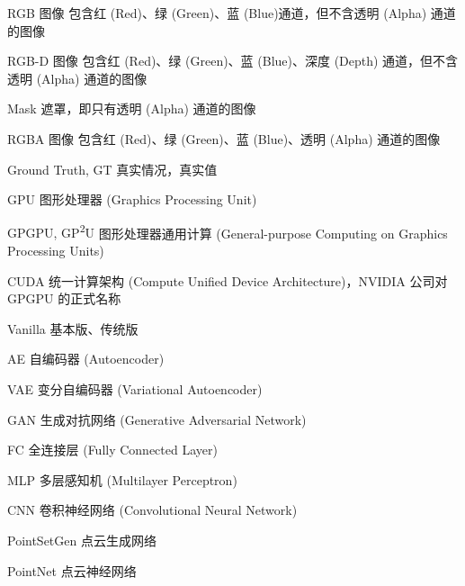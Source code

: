 \begin{denotation}[2.8cm]

	\item[RGB 图像]  包含红 (Red)、绿 (Green)、蓝 (Blue)通道，但不含透明 (Alpha) 通道的图像
	\item[RGB-D 图像]  包含红 (Red)、绿 (Green)、蓝 (Blue)、深度 (Depth) 通道，但不含透明 (Alpha) 通道的图像
	\item[Mask]     遮罩，即只有透明 (Alpha) 通道的图像
	\item[RGBA 图像] 包含红 (Red)、绿 (Green)、蓝 (Blue)、透明 (Alpha) 通道的图像

	\item[Ground Truth, GT] 真实情况，真实值

	\item[GPU]      图形处理器 (Graphics Processing Unit)
	\item[GPGPU, GP\textsuperscript{2}U]
	图形处理器通用计算 (General-purpose Computing on Graphics Processing Units)
	\item[CUDA]     统一计算架构 (Compute Unified Device Architecture)，NVIDIA 公司对 GPGPU 的正式名称



	\item[Vanilla]    基本版、传统版

	\item[AE]         自编码器 (Autoencoder)
	\item[VAE]        变分自编码器 (Variational Autoencoder)
	\item[GAN]        生成对抗网络 (Generative Adversarial Network)

	\item[FC]         全连接层 (Fully Connected Layer)
	\item[MLP]        多层感知机 (Multilayer Perceptron)
	\item[CNN]        卷积神经网络 (Convolutional Neural Network)
	\item[PointSetGen\cite{pointsetgen}]点云生成网络
	\item[PointNet\cite{pointnet}]   点云神经网络




\end{denotation}
